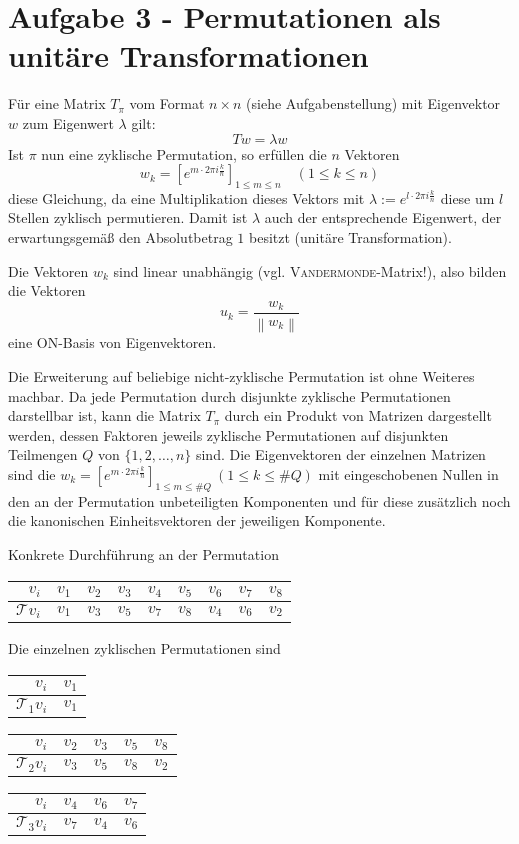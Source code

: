 \section*{Aufgabe 3 - Permutationen als unitäre Transformationen}
Für eine Matrix $T_{\pi}$ vom Format $n \times n$ (siehe Aufgabenstellung) mit
Eigenvektor $w$ zum Eigenwert $\lambda$ gilt:
\[ T w = \lambda w \]
Ist $\pi$ nun eine zyklische Permutation, so erfüllen die $n$ Vektoren
\[ w_k = [e^{m\cdot 2 \pi i \frac{k}{n}}]_{1\leq m\leq n} \quad (1 \leq k \leq n) \]
diese Gleichung, da eine Multiplikation dieses Vektors mit $\lambda := e^{l\cdot 2 \pi
i \frac{k}{n}}$ diese um $l$ Stellen zyklisch permutieren. Damit ist $\lambda$ auch der
entsprechende Eigenwert, der erwartungsgemäß den Absolutbetrag $1$ besitzt
(unitäre Transformation).

Die Vektoren $w_k$ sind linear unabhängig (vgl. \textsc{Vandermonde}-Matrix!),
also bilden die Vektoren
\[ u_k = \frac{w_k}{\left\|w_k\right\|} \]
eine ON-Basis von Eigenvektoren.

Die Erweiterung auf beliebige nicht-zyklische Permutation ist ohne Weiteres
machbar. Da jede Permutation durch disjunkte zyklische Permutationen
darstellbar ist, kann die Matrix $T_{\pi}$ durch ein Produkt von Matrizen
dargestellt werden, dessen Faktoren jeweils zyklische Permutationen auf
disjunkten Teilmengen $Q$ von $\{1, 2, \dots, n\}$ sind. Die Eigenvektoren der
einzelnen Matrizen sind die $w_k = [e^{m\cdot 2 \pi i \frac{k}{n}}]_{1\leq
m\leq \#Q}\ (1\leq k \leq \#Q)$ mit eingeschobenen Nullen in den an der
Permutation unbeteiligten Komponenten und für diese zusätzlich noch die
kanonischen Einheitsvektoren der jeweiligen Komponente.

Konkrete Durchführung an der Permutation
\begin{center}
\begin{tabular}{r|cccccccc}
$v_i$ & $v_1$ & $v_2$ & $v_3$ & $v_4$ & $v_5$ & $v_6$ & $v_7$ & $v_8$ \\
\hline
$\mathcal{T}v_i$ & $v_1$ & $v_3$ & $v_5$ & $v_7$ & $v_8$ & $v_4$ & $v_6$ & $v_2$
\end{tabular}
\end{center}

Die einzelnen zyklischen Permutationen sind
\begin{center}
\begin{tabular}{r|c}
$v_i$ & $v_1$ \\
\hline
$\mathcal{T}_1v_i$ & $v_1$
\end{tabular}\hspace{1em}
\begin{tabular}{r|cccc}
$v_i$ & $v_2$ & $v_3$ & $v_5$ & $v_8$ \\
\hline
$\mathcal{T}_2v_i$ & $v_3$ & $v_5$ & $v_8$ & $v_2$
\end{tabular}\hspace{1em}
\begin{tabular}{r|ccc}
$v_i$ & $v_4$ & $v_6$ & $v_7$ \\
\hline
$\mathcal{T}_3v_i$ & $v_7$ & $v_4$ & $v_6$
\end{tabular}
\end{center}

